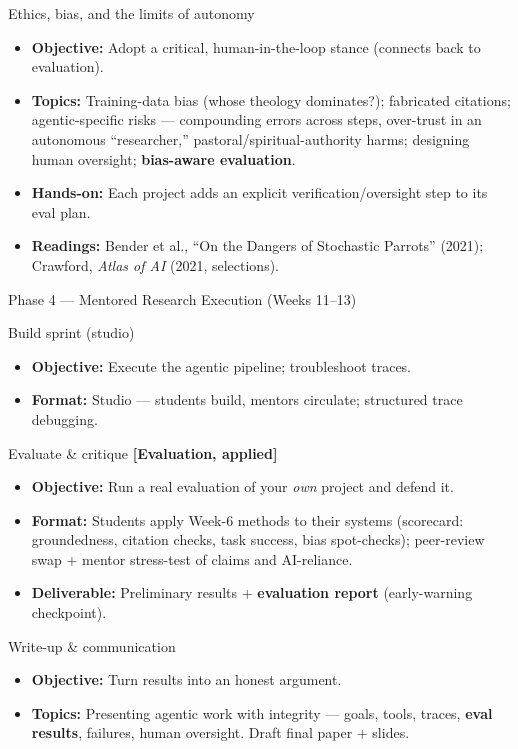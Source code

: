 \documentclass[11pt]{article}
\newcommand{\pillar}[1]{{\small\color{accent}\textbf{[#1]}}}
\newcommand{\phase}[1]{%
  \vspace{0.8em}
  \noindent\colorbox{primary}{\parbox{\dimexpr\textwidth-2\fboxsep}{%
    \color{white}\bfseries\large\strut #1}}\par\vspace{0.5em}}
\newenvironment{week}[2]{%
  \vspace{0.4em}
  \noindent{\color{primary}\bfseries #1}\; #2\par\nobreak
  \begin{itemize}[leftmargin=1.4em,itemsep=1pt,topsep=2pt]}%
  {\end{itemize}}
\begin{document}
\begin{week}{Week 10}{Ethics, bias, and the limits of autonomy}
  \item \textbf{Objective:} Adopt a critical, human-in-the-loop stance (connects back to evaluation).
  \item \textbf{Topics:} Training-data bias (whose theology dominates?); fabricated citations; agentic-specific
    risks --- compounding errors across steps, over-trust in an autonomous ``researcher,''
    pastoral/spiritual-authority harms; designing human oversight; \textbf{bias-aware evaluation}.
  \item \textbf{Hands-on:} Each project adds an explicit verification/oversight step to its eval plan.
  \item \textbf{Readings:} Bender et al., ``On the Dangers of Stochastic Parrots'' (2021); Crawford, \emph{Atlas of
    AI} (2021, selections).
\end{week}

\phase{Phase 4 --- Mentored Research Execution (Weeks 11--13)}

\begin{week}{Week 11}{Build sprint (studio)}
  \item \textbf{Objective:} Execute the agentic pipeline; troubleshoot traces.
  \item \textbf{Format:} Studio --- students build, mentors circulate; structured trace debugging.
\end{week}

\begin{week}{Week 12}{Evaluate \& critique \pillar{Evaluation, applied}}
  \item \textbf{Objective:} Run a real evaluation of your \emph{own} project and defend it.
  \item \textbf{Format:} Students apply Week-6 methods to their systems (scorecard: groundedness, citation
    checks, task success, bias spot-checks); peer-review swap + mentor stress-test of claims and AI-reliance.
  \item \textbf{Deliverable:} Preliminary results + \textbf{evaluation report} (early-warning checkpoint).
\end{week}

\begin{week}{Week 13}{Write-up \& communication}
  \item \textbf{Objective:} Turn results into an honest argument.
  \item \textbf{Topics:} Presenting agentic work with integrity --- goals, tools, traces, \textbf{eval results},
    failures, human oversight. Draft final paper + slides.
\end{week}
\end{document}
